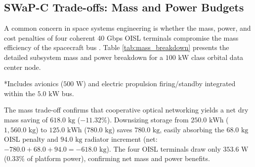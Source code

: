 \documentclass[journal]{IEEEtran}
\begin{document}
\subsection{SWaP-C Trade-offs: Mass and Power Budgets}
A common concern in space systems engineering is whether the mass, power, and cost penalties of four coherent 40 Gbps OISL terminals compromise the mass efficiency of the spacecraft bus \cite{turyshev2026orbital, kaushal2017optical, kaymak2018survey, delportillo2019technical}. Table \ref{tab:mass_breakdown} presents the detailed subsystem mass and power breakdown for a $100\text{ kW}$ class orbital data center node.

\begin{table}[!t]
\caption{Mass and Power Budgets: Standalone Baseline vs. Proposed Cooperative ODC (100 kW Compute Node)}
\label{tab:mass_breakdown}
\centering
{}
\vspace{0.2ex}
\footnotesize{*Includes avionics ($500\text{ W}$) and electric propulsion firing/standby integrated within the $5.0\text{ kW}$ bus.}
\end{table}

The mass trade-off confirms that cooperative optical networking yields a net dry mass saving of $618.0\text{ kg}$ ($-11.32\%$). Downsizing storage from $250.0\text{ kWh}$ ($1,560.0\text{ kg}$) to $125.0\text{ kWh}$ ($780.0\text{ kg}$) saves $780.0\text{ kg}$, easily absorbing the $68.0\text{ kg}$ OISL penalty and $94.0\text{ kg}$ radiator increment (net: $-780.0 + 68.0 + 94.0 = -618.0\text{ kg}$). The four OISL terminals draw only $353.6\text{ W}$ ($0.33\%$ of platform power), confirming net mass and power benefits.
\end{document}
